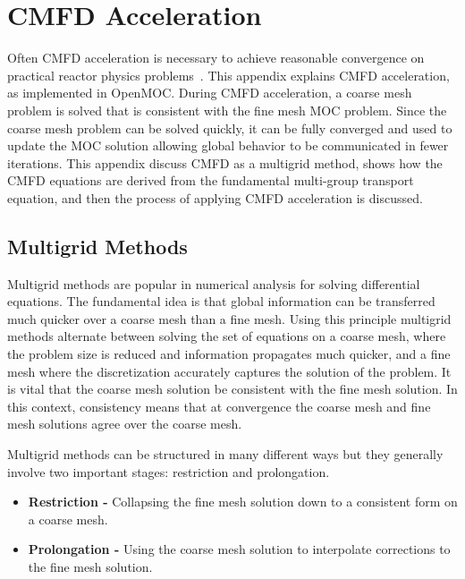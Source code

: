 \chapter{CMFD Acceleration}
\label{app:cmfd-acceleration}

Often \ac{CMFD} acceleration is necessary to achieve reasonable convergence on practical reactor physics problems~\cite{smith1983cmfd}. This appendix explains \ac{CMFD} acceleration, as implemented in OpenMOC. During \ac{CMFD} acceleration, a coarse mesh problem is solved that is consistent with the fine mesh \ac{MOC} problem. Since the coarse mesh problem can be solved quickly, it can be fully converged and used to update the \ac{MOC} solution allowing global behavior to be communicated in fewer iterations. This appendix discuss \ac{CMFD} as a multigrid method, shows how the \ac{CMFD} equations are derived from the fundamental multi-group transport equation, and then the process of applying \ac{CMFD} acceleration is discussed.

\section{Multigrid Methods}
\label{sec:multigrid}

Multigrid methods are popular in numerical analysis for solving differential equations. The fundamental idea is that global information can be transferred much quicker over a coarse mesh than a fine mesh. Using this principle multigrid methods alternate between solving the set of equations on a coarse mesh, where the problem size is reduced and information propagates much quicker, and a fine mesh where the discretization accurately captures the solution of the problem. It is vital that the coarse mesh solution be consistent with the fine mesh solution. In this context, consistency means that at convergence the coarse mesh and fine mesh solutions agree over the coarse mesh.

Multigrid methods can be structured in many different ways but they generally involve two important stages: restriction and prolongation.
\begin{itemize}
	\item \textbf{Restriction - } Collapsing the fine mesh solution down to a consistent form on a coarse mesh.
	\item \textbf{Prolongation - } Using the coarse mesh solution to interpolate corrections to the fine mesh solution.
\end{itemize}

